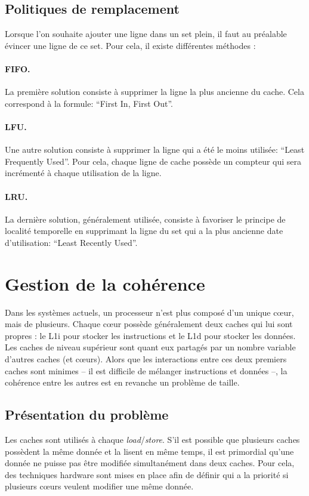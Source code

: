 
\subsection{Politiques de remplacement}
\label{remplacement}
 Lorsque l'on souhaite ajouter une ligne dans un set plein, il faut au préalable évincer une ligne de ce set. Pour cela, il existe différentes méthodes :

\paragraph{FIFO.} La première solution consiste à supprimer la ligne la plus ancienne du cache. Cela correspond à la formule: ``First In, First Out''.

\paragraph{LFU.} Une autre solution consiste à supprimer la ligne qui a été le moins utilisée: ``Least Frequently Used''. Pour cela, chaque ligne de cache possède un compteur qui sera incrémenté à chaque utilisation de la ligne. 

\paragraph{LRU.} La dernière solution, généralement utilisée, consiste à favoriser le principe de localité temporelle en supprimant la ligne du set qui a la plus ancienne date d'utilisation: ``Least Recently Used''.

\section{Gestion de la cohérence}
Dans les systèmes actuels, un processeur n'est plus composé d'un unique c{\oe}ur, mais de plusieurs. Chaque c{\oe}ur possède généralement deux caches qui lui sont propres : le L1i pour stocker les instructions et le L1d pour stocker les données. Les caches de niveau supérieur sont quant  eux partagés par un nombre variable d'autres caches (et c{\oe}urs). Alors que les interactions entre ces deux premiers caches sont minimes -- il est difficile de mélanger instructions et données --, la cohérence entre les autres est en revanche un problème de taille.

\subsection{Présentation du problème}
Les caches sont utilisés à chaque \textit{load}/\textit{store}. S'il est possible que plusieurs caches possèdent la même donnée et la lisent en même temps, il est primordial qu'une donnée ne puisse pas être modifiée simultanément dans deux caches. Pour cela, des techniques hardware sont mises en place afin de définir qui a la priorité si plusieurs c{\oe}urs veulent modifier une même donnée. \\

